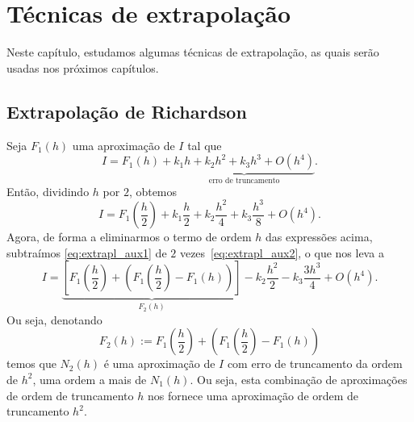 
\chapter{Técnicas de extrapolação}\label{cap_extrapl}
\thispagestyle{fancy}

Neste capítulo, estudamos algumas técnicas de extrapolação, as quais serão usadas nos próximos capítulos.

\section{Extrapolação de Richardson}\label{cap_extrapl_sec_Richardson}

Seja $F_1(h)$ uma aproximação de $I$ tal que
\begin{equation}\label{eq:extrapl_aux1}
  I = F_1(h) + \underbrace{k_1h + k_2h^2 + k_3h^3 + O(h^4)}_{\text{erro de truncamento}}.
\end{equation}
Então, dividindo $h$ por $2$, obtemos
\begin{equation}\label{eq:extrapl_aux2}
  I = F_1\left(\frac{h}{2}\right) + k_1\frac{h}{2} + k_2\frac{h^2}{4} + k_3\frac{h^3}{8} + O(h^4).
\end{equation}
Agora, de forma a eliminarmos o termo de ordem $h$ das expressões acima, subtraímos \eqref{eq:extrapl_aux1} de $2$ vezes~\eqref{eq:extrapl_aux2}, o que nos leva a
\begin{equation}\label{eq:extrapl_aux3}
  I = \underbrace{\left[F_1\left(\frac{h}{2}\right) + \left(F_1\left(\frac{h}{2}\right) - F_1(h)\right)\right]}_{F_2(h)} - k_2\frac{h^2}{2} - k_3\frac{3h^3}{4} + O(h^4).
\end{equation}
Ou seja, denotando
\begin{equation}
  F_2(h) := F_1\left(\frac{h}{2}\right) + \left(F_1\left(\frac{h}{2}\right) - F_1(h)\right)
\end{equation}
temos que $N_2(h)$ é uma aproximação de $I$ com erro de truncamento da ordem de $h^2$, uma ordem a mais de $N_1(h)$. Ou seja, esta combinação de aproximações de ordem de truncamento $h$ nos fornece uma aproximação de ordem de truncamento $h^2$.

